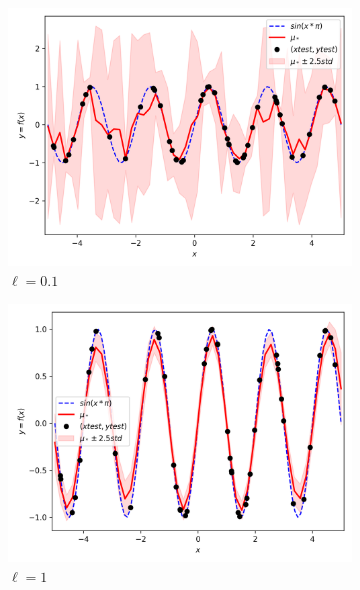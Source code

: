 \documentclass{article}
\begin{document}
\begin{figure}[h]
  \begin{subfigure}{.33\textwidth}
    \centering
    \includegraphics[width=\linewidth]{kernelSE/ell/0_1.png}
    \caption{$\ell = 0.1$}
    \label{fig:ell01}
  \end{subfigure}
  \begin{subfigure}{.33\textwidth}
    \centering
    \includegraphics[width=\linewidth]{kernelSE/ell/1.png}
    \caption{$\ell = 1$}
    \label{fig:ell1}
  \end{subfigure}
  \begin{subfigure}{.33\textwidth}
    \centering

\end{subfigure}
\end{figure}
\end{document}
